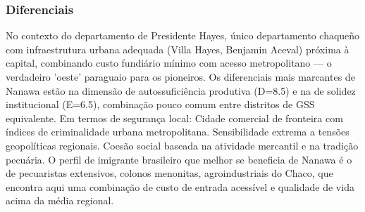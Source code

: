 \subsubsection*{Diferenciais}\label{dif-nanawa-1505}
No contexto do departamento de Presidente Hayes, único departamento chaqueño com infraestrutura urbana adequada (Villa Hayes, Benjamin Aceval) próxima à capital, combinando custo fundiário mínimo com acesso metropolitano — o verdadeiro 'oeste' paraguaio para os pioneiros. Os diferenciais mais marcantes de Nanawa estão na dimensão de autossuficiência produtiva (D=8.5) e na de solidez institucional (E=6.5), combinação pouco comum entre distritos de GSS equivalente. Em termos de segurança local: Cidade comercial de fronteira com índices de criminalidade urbana metropolitana. Sensibilidade extrema a tensões geopolíticas regionais. Coesão social baseada na atividade mercantil e na tradição pecuária. O perfil de imigrante brasileiro que melhor se beneficia de Nanawa é o de pecuaristas extensivos, colonos menonitas, agroindustriais do Chaco, que encontra aqui uma combinação de custo de entrada acessível e qualidade de vida acima da média regional.

